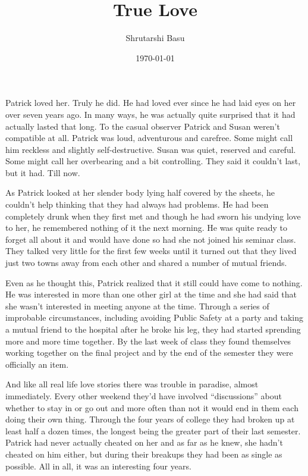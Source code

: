\documentclass[11pt,letterpaper]{article}
\title{True Love}
\author{Shrutarshi Basu}
\date{\today}
\begin{document}
\maketitle
\doublespacing

Patrick loved her. Truly he did. He had loved ever since he had laid eyes on her over seven years ago. In many ways, he was actually quite surprised that it had actually lasted that long. To the casual observer Patrick and Susan weren't compatible at all. Patrick was loud, adventurous and carefree. Some might call him reckless and slightly self-destructive. Susan was quiet, reserved and careful. Some might call her overbearing and a bit controlling. They said it couldn't last, but it had. Till now.

As Patrick looked at her slender body lying half covered by the sheets, he couldn't help thinking that they had always had problems. He had been completely drunk when they first met and though he had sworn his undying love to her, he remembered nothing of it the next morning. He was quite ready to forget all about it and would have done so had she not joined his seminar class. They talked very little for the first few weeks until it turned out that they lived just two towns away from each other and shared a number of mutual friends.

Even as he thought this, Patrick realized that it still could have come to nothing. He was interested in more than one other girl at the time and she had said that she wasn't interested in meeting anyone at the time. Through a series of improbable circumstances, including avoiding Public Safety at a party and taking a mutual friend to the hospital after he broke his leg, they had started sprending more and more time together. By the last week of class they found themselves working together on the final project and by the end of the semester they were officially an item.

And like all real life love stories there was trouble in paradise, almost immediately. Every other weekend they'd have involved ``discussions'' about whether to stay in or go out and more often than not it would end in them each doing their own thing. Through the four years of college they had broken up at least half a dozen times, the longest being the greater part of their last semester. Patrick had never actually cheated on her and as far as he knew, she hadn't cheated on him either, but during their breakups they had been as single as possible. All in all,  it was an interesting four years.
\end{document}
